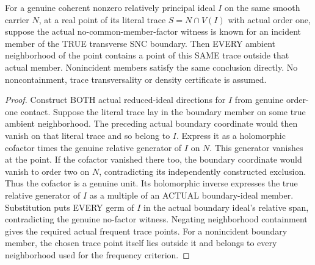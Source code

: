 \begin{lemma}
\label{hir:sharp-actual-order-one-no-factor-exceptional-noncontainment}
\leanok
For a genuine coherent nonzero relatively principal ideal $I$ on the same
smooth carrier $N$, at a real point of its literal trace $S=N\cap V(I)$
with actual order one, suppose the actual no-common-member-factor witness
is known for an incident member of the TRUE transverse SNC boundary.
Then EVERY ambient neighborhood of the point contains a point of this
SAME trace outside that actual member. Nonincident members satisfy the
same conclusion directly. No noncontainment, trace transversality or
density certificate is assumed.
\end{lemma}
\begin{proof}
Construct BOTH actual reduced-ideal directions for $I$ from genuine
order-one contact. Suppose the literal trace lay in the boundary member
on some true ambient neighborhood. The preceding actual boundary
coordinate would then vanish on that literal trace and so belong to $I$.
Express it as a holomorphic cofactor times the genuine relative generator
of $I$ on $N$. This generator vanishes at the point. If the cofactor
vanished there too, the boundary coordinate would vanish to order two on
$N$, contradicting its independently constructed exclusion. Thus the
cofactor is a genuine unit. Its holomorphic inverse expresses the true
relative generator of $I$ as a multiple of an ACTUAL boundary-ideal
member. Substitution puts EVERY germ of $I$ in the actual boundary ideal's
relative span, contradicting the genuine no-factor witness. Negating
neighborhood containment gives the required actual frequent trace points.
For a nonincident boundary member, the chosen trace point itself lies
outside it and belongs to every neighborhood used for the frequency
criterion.
\end{proof}

